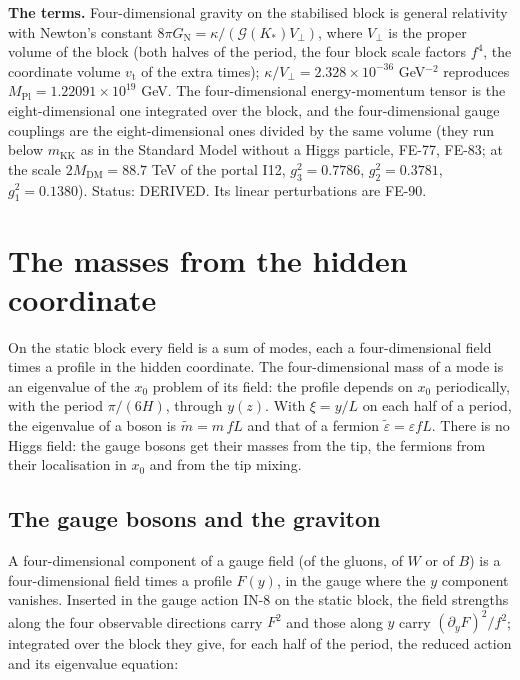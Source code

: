\documentclass[
  10pt,
]{article}
\begin{document}
\textbf{The terms.} Four-dimensional gravity on the stabilised block is
general relativity with Newton's constant
\(8\pi G_{\mathrm{N}} = \kappa/(\mathcal{G}(K_*)V_\perp)\), where
\(V_\perp\) is the proper volume of the block (both halves of the
period, the four block scale factors \(f^4\), the coordinate volume
\(v_{\mathrm{t}}\) of the extra times);
\(\kappa/V_\perp = 2.328\times10^{-36}\) GeV\(^{-2}\) reproduces
\(M_{\mathrm{Pl}} = 1.22091\times10^{19}\) GeV. The four-dimensional
energy-momentum tensor is the eight-dimensional one integrated over the
block, and the four-dimensional gauge couplings are the
eight-dimensional ones divided by the same volume (they run below
\(m_{\mathrm{KK}}\) as in the Standard Model without a Higgs particle,
FE-77, FE-83; at the scale \(2M_{\mathrm{DM}} = 88.7\) TeV of the portal
I12, \(g_3^2 = 0.7786\), \(g_2^2 = 0.3781\), \(g_1^2 = 0.1380\)).
Status: DERIVED. Its linear perturbations are FE-90.

\hypertarget{the-masses-from-the-hidden-coordinate}{%
\section{The masses from the hidden
coordinate}\label{the-masses-from-the-hidden-coordinate}}

On the static block every field is a sum of modes, each a
four-dimensional field times a profile in the hidden coordinate. The
four-dimensional mass of a mode is an eigenvalue of the \(x_0\) problem
of its field: the profile depends on \(x_0\) periodically, with the
period \(\pi/(6H)\), through \(y(z)\). With \(\xi = y/L\) on each half
of a period, the eigenvalue of a boson is \(\tilde m = m\,fL\) and that
of a fermion \(\tilde\varepsilon = \varepsilon fL\). There is no Higgs
field: the gauge bosons get their masses from the tip, the fermions from
their localisation in \(x_0\) and from the tip mixing.

\hypertarget{the-gauge-bosons-and-the-graviton}{%
\subsection{The gauge bosons and the
graviton}\label{the-gauge-bosons-and-the-graviton}}

A four-dimensional component of a gauge field (of the gluons, of \(W\)
or of \(B\)) is a four-dimensional field times a profile \(F(y)\), in
the gauge where the \(y\) component vanishes. Inserted in the gauge
action IN-8 on the static block, the field strengths along the four
observable directions carry \(F^2\) and those along \(y\) carry
\((\partial_yF)^2/f^2\); integrated over the block they give, for each
half of the period, the reduced action and its eigenvalue equation:
\end{document}

